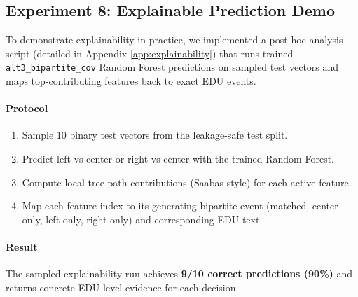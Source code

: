 \documentclass[11pt]{article}
\begin{document}
\subsection{Experiment 8: Explainable Prediction Demo}
\label{sec:explainability}

To demonstrate explainability in practice, we implemented a post-hoc analysis script (detailed in Appendix \ref{app:explainability}) that runs trained \texttt{alt3\_bipartite\_cov} Random Forest predictions on sampled test vectors and maps top-contributing features back to exact EDU events.

\paragraph{Protocol}
\begin{enumerate}
    \item Sample 10 binary test vectors from the leakage-safe test split.
    \item Predict left-vs-center or right-vs-center with the trained Random Forest.
    \item Compute local tree-path contributions (Saabas-style) for each active feature.
    \item Map each feature index to its generating bipartite event (matched, center-only, left-only, right-only) and corresponding EDU text.
\end{enumerate}

\paragraph{Result}
The sampled explainability run achieves \textbf{9/10 correct predictions (90\%)} and returns concrete EDU-level evidence for each decision.
\end{document}
